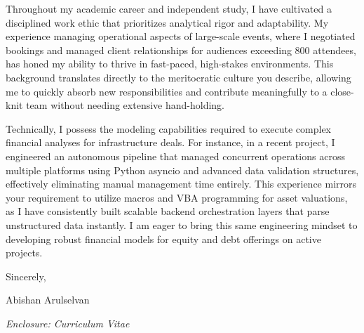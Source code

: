 \documentclass[letterpaper,11pt]{article}
\begin{document}
Throughout my academic career and independent study, I have cultivated a disciplined work ethic that prioritizes analytical rigor and adaptability. My experience managing operational aspects of large-scale events, where I negotiated bookings and managed client relationships for audiences exceeding 800 attendees, has honed my ability to thrive in fast-paced, high-stakes environments. This background translates directly to the meritocratic culture you describe, allowing me to quickly absorb new responsibilities and contribute meaningfully to a close-knit team without needing extensive hand-holding.

Technically, I possess the modeling capabilities required to execute complex financial analyses for infrastructure deals. For instance, in a recent project, I engineered an autonomous pipeline that managed concurrent operations across multiple platforms using Python asyncio and advanced data validation structures, effectively eliminating manual management time entirely. This experience mirrors your requirement to utilize macros and VBA programming for asset valuations, as I have consistently built scalable backend orchestration layers that parse unstructured data instantly. I am eager to bring this same engineering mindset to developing robust financial models for equity and debt offerings on active projects.

\vspace{2.5em}

\nopagebreak
{\setlength{\parindent}{0pt}
Sincerely,

\vspace{1.5em} %

Abishan Arulselvan
\par}

\vspace{3em}

{\setlength{\parindent}{0pt} \textit{Enclosure: Curriculum Vitae} \par}
\end{document}

